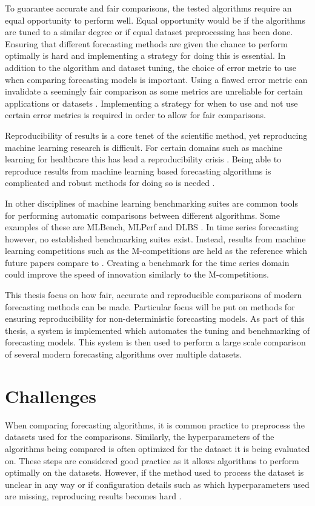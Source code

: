 To guarantee accurate and fair comparisons, the tested algorithms require an equal opportunity to perform well. Equal opportunity would be if the algorithms are tuned to a similar degree or if equal dataset preprocessing has been done. Ensuring that different forecasting methods are given the chance to perform optimally is hard and implementing a strategy for doing this is essential. In addition to the algorithm and dataset tuning, the choice of error metric to use when comparing forecasting models is important. Using a flawed error metric can invalidate a seemingly fair comparison as some metrics are unreliable for certain applications or datasets \cite{goodwin_asymmetry_1999}. Implementing a strategy for when to use and not use certain error metrics is required in order to allow for fair comparisons.

Reproducibility of results is a core tenet of the scientific method, yet reproducing machine learning research is difficult. For certain domains such as machine learning for healthcare this has lead a reproducibility crisis \cite{beam2020challenges, mcdermott2019reproducibility}. Being able to reproduce results from machine learning based forecasting algorithms is complicated and robust methods for doing so is needed \cite{pineau2020improving, makridakis_m4_2020}.

In other disciplines of machine learning benchmarking suites are common tools for performing automatic comparisons between different algorithms. Some examples of these are MLBench, MLPerf and DLBS \cite{noauthor_mlbench_nodate,mattson_mlperf_2020,vassilieva_deep_nodate}. In time series forecasting however, no established benchmarking suites exist. Instead, results from machine learning competitions such as the M-competitions are held as the reference which future papers compare to \cite{m3_competition,makridakis_m4_2020,m5}. Creating a benchmark for the time series domain could improve the speed of innovation similarly to the M-competitions.

This thesis focus on how fair, accurate and reproducible comparisons of modern forecasting methods can be made. Particular focus will be put on methods for ensuring reproducibility for non-deterministic forecasting models. As part of this thesis, a system is implemented which automates the tuning and benchmarking of forecasting models. This system is then used to perform a large scale comparison of several modern forecasting algorithms over multiple datasets.

\section{Challenges}
When comparing forecasting algorithms, it is common practice to preprocess the datasets used for the comparisons. Similarly, the hyperparameters of the algorithms being compared is often optimized for the dataset it is being evaluated on. These steps are considered good practice as it allows algorithms to perform optimally on the datasets. However, if the method used to process the dataset is unclear in any way or if configuration details such as which hyperparameters used are missing, reproducing results becomes hard \cite{makridakis_m4_2020}.

